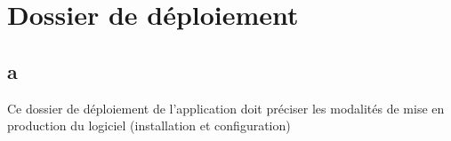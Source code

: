	
	\part{Dossier de déploiement}
	
	\setcounter{chapter}{0} %
	\setcounter{section}{0} %
	
	\renewcommand*{\theHchapter}{\thepart.\thechapter}
	\chapter{a}
	
	Ce dossier de déploiement de l'application doit préciser les modalités de mise en production du logiciel (installation et configuration) 